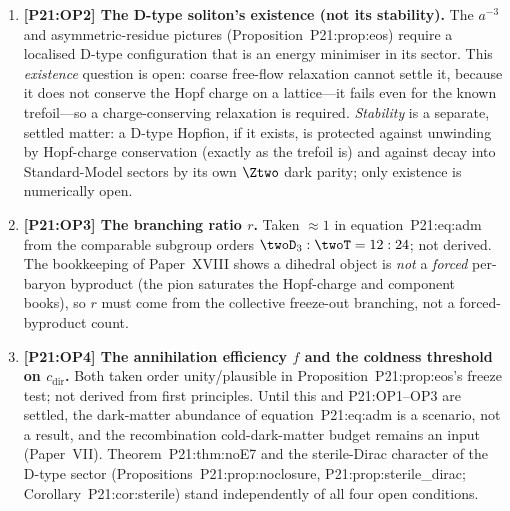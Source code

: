 \begin{enumerate}[label=,leftmargin=*]
\item \textbf{[P21:OP2] The D-type soliton's existence (not its
stability).} The $a^{-3}$ and asymmetric-residue pictures
(Proposition~P21:prop:eos) require a localised D-type configuration
that is an energy minimiser in its sector. This \emph{existence}
question is open: coarse free-flow relaxation cannot settle it, because
it does not conserve the Hopf charge on a lattice---it fails even for
the known trefoil---so a charge-conserving relaxation is required.
\emph{Stability} is a separate, settled matter: a D-type Hopfion, if it
exists, is protected against unwinding by Hopf-charge conservation
(exactly as the trefoil is) and against decay into Standard-Model
sectors by its own $\Ztwo$ dark parity; only existence is numerically
open.

\item \textbf{[P21:OP3] The branching ratio $r$.} Taken $\approx1$ in
equation~P21:eq:adm from the comparable subgroup orders
$\twoD_3:\twoT=12:24$; not derived. The bookkeeping of Paper~XVIII shows
a dihedral object is \emph{not} a \emph{forced} per-baryon byproduct
(the pion saturates the Hopf-charge and component books), so $r$ must
come from the collective freeze-out branching, not a forced-byproduct
count.

\item \textbf{[P21:OP4] The annihilation efficiency $f$ and the
coldness threshold on $c_{\mathrm{dir}}$.} Both taken order
unity/plausible in Proposition~P21:prop:eos's freeze test; not derived
from first principles. Until this and P21:OP1--OP3 are settled, the
dark-matter abundance of equation~P21:eq:adm is a scenario, not a
result, and the recombination cold-dark-matter budget remains an input
(Paper~VII). Theorem~P21:thm:noE7 and the sterile-Dirac character of
the D-type sector (Propositions~P21:prop:noclosure,
P21:prop:sterile\_dirac; Corollary~P21:cor:sterile) stand independently
of all four open conditions.

\end{enumerate}
